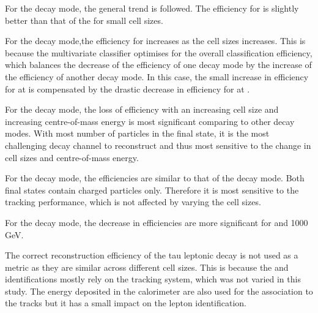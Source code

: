 For the \decayPionShort decay mode, the general trend is followed. The efficiency for  is slightly better than that of the  for small cell sizes.

For the \decayRhoShort decay mode,the efficiency for   increases as the cell sizes increases. This is because the multivariate classifier optimises for the overall classification efficiency, which balances the decrease of the efficiency of one decay mode by the increase of the efficiency of another decay mode. In this case, the small increase in efficiency for \decayRhoShort at  is compensated by the drastic decrease in efficiency for \decayAiPhotonShort at  .

For the \decayAiPhotonShort decay mode, the loss of efficiency with an increasing \ECAL  cell size and increasing centre-of-mass energy is most significant comparing to other decay modes. With most number of particles in the final state, it is the most challenging decay channel to reconstruct and thus most sensitive to the change in cell sizes and centre-of-mass energy.

For the \decayAiPionShort decay mode, the efficiencies are similar to that of the \decayPionShort decay mode. Both final states contain charged particles only. Therefore it is most sensitive to the tracking performance, which is not affected by varying the \ECAL cell sizes.

For the \decayThreePionPhotonShort decay mode, the decrease in efficiencies are more significant for  and 1000\,GeV.

The   correct reconstruction efficiency of the tau leptonic decay is not used as a metric as they are similar across different \ECAL cell sizes. This is because the \Pepm and \Pgmpm identifications mostly rely on the tracking system, which was not varied in this study. The energy deposited in the calorimeter are also used for the association to the tracks but it has a small impact on the lepton identification.






